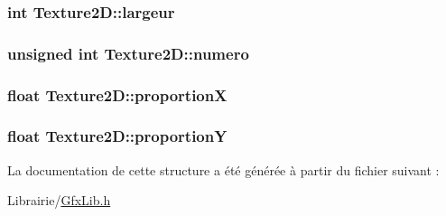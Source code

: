 \subsubsection[{\texorpdfstring{largeur}{largeur}}]{\setlength{\rightskip}{0pt plus 5cm}int Texture2\+D\+::largeur}\hypertarget{struct_texture2_d_a21ab2d185b964d6663995ed3cb044611}{}\label{struct_texture2_d_a21ab2d185b964d6663995ed3cb044611}
\subsubsection[{\texorpdfstring{numero}{numero}}]{\setlength{\rightskip}{0pt plus 5cm}unsigned int Texture2\+D\+::numero}\hypertarget{struct_texture2_d_a39a209135bf27bf53f0ae2882e39f309}{}\label{struct_texture2_d_a39a209135bf27bf53f0ae2882e39f309}
\subsubsection[{\texorpdfstring{proportionX}{proportionX}}]{\setlength{\rightskip}{0pt plus 5cm}float Texture2\+D\+::proportionX}\hypertarget{struct_texture2_d_ac7d624b3aab0cd29f551e104f72bc939}{}\label{struct_texture2_d_ac7d624b3aab0cd29f551e104f72bc939}
\subsubsection[{\texorpdfstring{proportionY}{proportionY}}]{\setlength{\rightskip}{0pt plus 5cm}float Texture2\+D\+::proportionY}\hypertarget{struct_texture2_d_a6355c1365aa11fe62e65959d9e5efabf}{}\label{struct_texture2_d_a6355c1365aa11fe62e65959d9e5efabf}


La documentation de cette structure a été générée à partir du fichier suivant \+:\begin{DoxyCompactItemize}
\item 
Librairie/\hyperlink{_gfx_lib_8h}{Gfx\+Lib.\+h}\end{DoxyCompactItemize}
